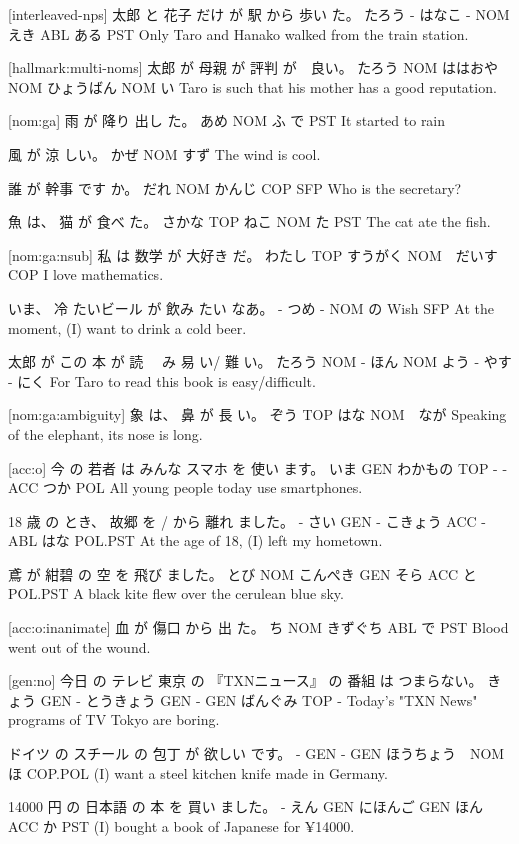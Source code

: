 [interleaved-nps]
太郎  と 花子  だけ が  駅  から 歩い  た。
たろう - はなこ -  NOM えき ABL ある  PST
Only Taro and Hanako walked from the train station.

[hallmark:multi-noms]
太郎  が   母親    が   評判      が　良い。
たろう NOM ははおや NOM ひょうばん NOM い
Taro is such that his mother has a good reputation.

[nom:ga]
雨  が   降り 出し た。
あめ NOM ふ   で PST
It started to rain

風  が   涼 しい。
かぜ NOM すず
The wind is cool.

誰  が   幹事   です か。
だれ NOM かんじ  COP SFP
Who is the secretary?

魚    は、 猫   が  食べ た。
さかな TOP ねこ NOM た  PST
The cat ate the fish.

[nom:ga:nsub]
私    は   数学    が   大好き だ。
わたし TOP すうがく NOM　だいす COP
I love mathematics.

いま、 冷  たいビール が  飲み たい なあ。
-    つめ -       NOM  の  Wish SFP
At the moment, (I) want to drink a cold beer.

太郎   が この 本   が  読 　み 易 い/ 難 い。
たろう NOM -  ほん NOM よう - やす - にく
For Taro to read this book is easy/difficult.

[nom:ga:ambiguity]
象   は、 鼻  が   長 い。
ぞう TOP はな NOM　なが
Speaking of the elephant, its nose is long.

[acc:o]
今   の  若者    は  みんな スマホ を  使い ます。
いま GEN わかもの TOP -    -     ACC つか POL
All young people today use smartphones.

18 歳  の とき、 故郷    を   / から 離れ ました。
- さい GEN -    こきょう ACC - ABL はな POL.PST
At the age of 18, (I) left my hometown.

鳶   が  紺碧     の  空  を  飛び ました。
とび NOM こんぺき GEN そら ACC と   POL.PST
A black kite flew over the cerulean blue sky.

[acc:o:inanimate]
血 が   傷口   から 出 た。
ち NOM きずぐち ABL で PST
Blood went out of the wound.

[gen:no]
今日   の  テレビ 東京  の 『TXNニュース』 の  番組   は  つまらない。
きょう GEN - とうきょう GEN -        GEN ばんぐみ TOP -
Today's "TXN News" programs of TV Tokyo are boring.

ドイツ の スチール の 包丁   が      欲しい です。
-    GEN -     GEN ほうちょう　NOM ほ   COP.POL
(I) want a steel kitchen knife made in Germany.

14000 円  の  日本語   の  本   を  買い ました。
-    えん GEN にほんご GEN ほん ACC か   PST
(I) bought a book of Japanese for ¥14000.

